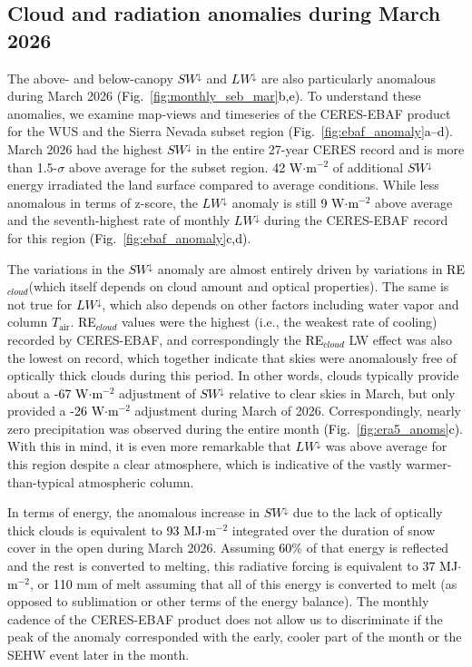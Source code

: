 \documentclass[draft]{agujournal2019}
\newcommand{\fig}[2]{\textcolor{black}{(Fig.~\ref{#1}{#2})}}   %
\newcommand{\mynum}[1]{\textcolor{black}{#1}}
\newcommand{\tair}{\textcolor{black}{$T_{\mathrm{air}}$}\xspace}
\newcommand{\lwdn}{\textcolor{black}{$LW^{\downarrow}$}\xspace}
\newcommand{\swdn}{\textcolor{black}{$SW^{\downarrow}$}\xspace}
\newcommand{\rfcirrus}{\textcolor{black}{RE$_{cloud}$}\xspace}
\newcommand{\wmsq}{\textcolor{black}{W$\cdot$m$^{-2}$}\xspace}
\newcommand{\mjmtwo}{\textcolor{black}{MJ$\cdot$m$^{-2}$}\xspace}
\begin{document}
\subsection{Cloud and radiation anomalies during March 2026}\label{sec:results_ceres_ebaf}

The above- and below-canopy \swdn and \lwdn are also particularly anomalous during March 2026 \fig{fig:monthly_seb_mar}{b,e}.
To understand these anomalies, we examine map-views and timeseries of the CERES-EBAF product for the WUS and the Sierra Nevada subset region \fig{fig:ebaf_anomaly}{a--d}.
March 2026 had the highest \swdn in the entire 27-year CERES record and is more than 1.5-$\sigma$ above average for the subset region.
\mynum{42} \wmsq of additional \swdn energy irradiated the land surface compared to average conditions.
While less anomalous in terms of z-score, the \lwdn anomaly is still \mynum{9} \wmsq above average and the seventh-highest rate of monthly \lwdn during the CERES-EBAF record for this region \fig{fig:ebaf_anomaly}{c,d}.

The variations in the \swdn anomaly are almost entirely driven by variations in \rfcirrus (which itself depends on cloud amount and optical properties).
The same is not true for \lwdn, which also depends on other factors including water vapor and column \tair.
\rfcirrus values were the highest (i.e., the weakest rate of cooling) recorded by CERES-EBAF, and correspondingly the \rfcirrus LW effect was also the lowest on record, which together indicate that skies were anomalously free of optically thick clouds during this period.
In other words, clouds typically provide about a \mynum{-67} \wmsq adjustment of \swdn relative to clear skies in March, but only provided a \mynum{-26} \wmsq adjustment during March of 2026.
Correspondingly, nearly zero precipitation was observed during the entire month \fig{fig:era5_anoms}{c}.
With this in mind, it is even more remarkable that \lwdn was above average for this region despite a clear atmosphere, which is indicative of the vastly warmer-than-typical atmospheric column. 


In terms of energy, the anomalous increase in \swdn due to the lack of optically thick clouds is equivalent to \mynum{93} \mjmtwo integrated over the duration of snow cover in the open during March 2026. 
Assuming \mynum{60}\% of that energy is reflected and the rest is converted to melting, this radiative forcing is equivalent to \mynum{37} \mjmtwo, or \mynum{110} mm of melt assuming that all of this energy is converted to melt (as opposed to sublimation or other terms of the energy balance).
The monthly cadence of the CERES-EBAF product does not allow us to discriminate if the peak of the anomaly corresponded with the early, cooler part of the month or the SEHW event later in the month.
\end{document}
